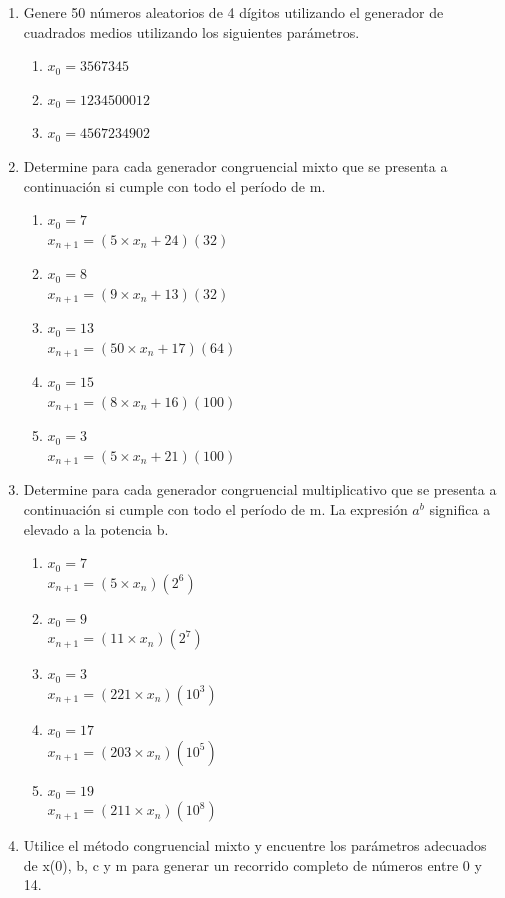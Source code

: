 \begin{enumerate}
    \item Genere 50 números aleatorios de 4 dígitos utilizando el generador de cuadrados medios utilizando los siguientes parámetros.
    \begin{enumerate}[label=\alph*.]
    \item $x_0 = 3567345$
    \item $x_0 = 1234500012$
    \item $x_0 = 4567234902$
    \end{enumerate}
    \item Determine para cada generador congruencial mixto que se presenta a continuación si cumple con todo el período de m.
    \begin{enumerate}[label=\alph*.]
    \item $x_0 = 7$ \\$x_{n+1} = (5 \times x_n + 24)(32)$
    \item $x_0 = 8$ \\$x_{n+1} = (9 \times x_n + 13)(32)$
    \item $x_0 = 13$ \\$x_{n+1} = (50 \times x_n + 17)(64)$
    \item $x_0 = 15$ \\$x_{n+1} = (8 \times x_n + 16)(100)$
    \item $x_0 = 3$ \\$x_{n+1} = (5 \times x_n + 21)(100)$
    \end{enumerate}
    \item Determine para cada generador congruencial multiplicativo que se presenta a continuación si cumple con todo el período de m. La expresión $a^b$ significa a elevado a la potencia b. 
    \begin{enumerate}[label=\alph*.]
    \item $x_0 = 7$\\$x_{n+1} = (5 \times x_n)(2^6)$
    \item $x_0 = 9$\\$x_{n+1} = (11 \times x_n)(2^7)$
    \item $x_0 = 3$\\$x_{n+1} = (221 \times x_n)(10^3)$
    \item $x_0 = 17$\\$x_{n+1} = (203 \times x_n)(10^5)$
    \item $x_0 = 19$\\$x_{n+1} = (211 \times x_n)(10^8)$
    \end{enumerate}
    \item Utilice el método congruencial mixto y encuentre los parámetros adecuados de x(0), b, c y m para generar un recorrido completo de números entre 0 y 14.

\end{enumerate}
